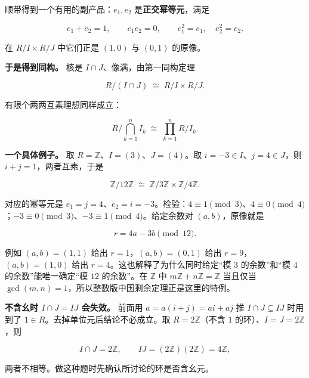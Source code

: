 顺带得到一个有用的副产品：$e_1,e_2$ 是\textbf{正交幂等元}，满足

\[
e_1+e_2=1,\qquad e_1e_2=0,\qquad e_1^2=e_1,\quad e_2^2=e_2 .
\]

在 $R/I\times R/J$ 中它们正是 $(1,0)$ 与 $(0,1)$ 的原像。

\textbf{于是得到同构。} 核是 $I\cap J$、像满，由第一同构定理

\[
R/(I\cap J)\;\cong\;R/I\times R/J.
\]

有限个两两互素理想同样成立：

\[
R/\bigcap_{k=1}^n I_k\;\cong\;\prod_{k=1}^n R/I_k.
\]

\textbf{一个具体例子。} 取 $R=\mathbb Z$、$I=(3)$、$J=(4)$。取 $i=-3\in I$、$j=4\in J$，则 $i+j=1$，两者互素，于是

\[
\mathbb Z/12\mathbb Z\;\cong\;\mathbb Z/3\mathbb Z\times\mathbb Z/4\mathbb Z .
\]

对应的幂等元是 $e_1=j=4$、$e_2=i=-3$。检验：$4\equiv1\pmod3$、$4\equiv0\pmod4$；$-3\equiv0\pmod3$、$-3\equiv1\pmod4$。给定余数对 $(a,b)$，原像就是

\[
r=4a-3b \pmod{12}.
\]

例如 $(a,b)=(1,1)$ 给出 $r=1$，$(a,b)=(0,1)$ 给出 $r=9$，$(a,b)=(1,0)$ 给出 $r=4$。这也解释了为什么同时给定“模 $3$ 的余数”和“模 $4$ 的余数”能唯一确定“模 $12$ 的余数”。在 $\mathbb Z$ 中 $m\mathbb Z+n\mathbb Z=\mathbb Z$ 当且仅当 $\gcd(m,n)=1$，所以整数版中国剩余定理正是这里的特例。

\textbf{不含幺时 $I\cap J=IJ$ 会失效。} 前面用 $a=a(i+j)=ai+aj$ 推 $I\cap J\subseteq IJ$ 时用到了 $1\in R$。去掉单位元后结论不必成立。取 $R=2\mathbb Z$（不含 $1$ 的环）、$I=J=2\mathbb Z$，则

\[
I\cap J=2\mathbb Z,\qquad IJ=(2\mathbb Z)(2\mathbb Z)=4\mathbb Z,
\]

两者不相等。做这种题时先确认所讨论的环是否含幺元。
